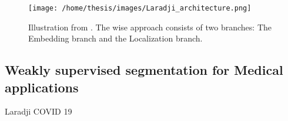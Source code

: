 \begin{SCfigure}[][htb]
    \texttt{[image: /home/thesis/images/Laradji\_architecture.png]}
    \caption{Illustration from \cite{Laradji2020}. The \acrshort{wise} approach consists of two branches: The Embedding branch and the Localization branch.}
    \label{fig:Laradji}
  \end{SCfigure}

\subsection{Weakly supervised segmentation for Medical applications}

Laradji COVID 19
